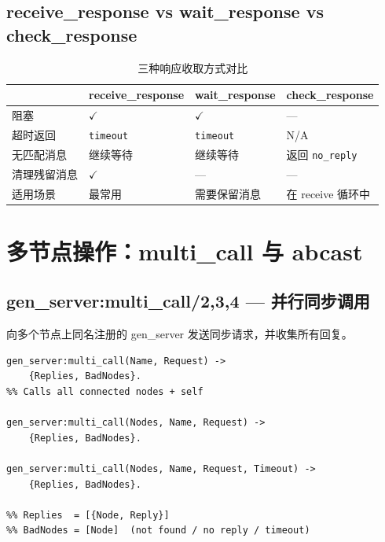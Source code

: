\documentclass[a4paper,11pt]{article}
\begin{document}
\subsection{receive\_response vs wait\_response vs check\_response}

\begin{table}[H]
\centering
\small
\begin{tabular}{@{}lp{3.5cm}p{3.5cm}p{3.5cm}@{}}
\toprule
 & \textbf{receive\_response} & \textbf{wait\_response} & \textbf{check\_response} \\
\midrule
阻塞 & $\checkmark$ & $\checkmark$ & --- \\
超时返回 & \texttt{timeout} & \texttt{timeout} & N/A \\
无匹配消息 & 继续等待 & 继续等待 & 返回 \texttt{no\_reply} \\
清理残留消息 & $\checkmark$ & --- & --- \\
适用场景 & 最常用 & 需要保留消息 & 在 receive 循环中 \\
\bottomrule
\end{tabular}
\caption{三种响应收取方式对比}
\label{tab:response-functions}
\end{table}


\section{多节点操作：multi\_call 与 abcast}

\subsection{gen\_server:multi\_call/2,3,4 --- 并行同步调用}

向多个节点上同名注册的 gen\_server 发送同步请求，并收集所有回复。

\begin{lstlisting}[style=erlangstyle, caption={multi\_call 函数签名}]
gen_server:multi_call(Name, Request) ->
    {Replies, BadNodes}.
%% Calls all connected nodes + self

gen_server:multi_call(Nodes, Name, Request) ->
    {Replies, BadNodes}.

gen_server:multi_call(Nodes, Name, Request, Timeout) ->
    {Replies, BadNodes}.

%% Replies  = [{Node, Reply}]
%% BadNodes = [Node]  (not found / no reply / timeout)
\end{lstlisting}
\end{document}
